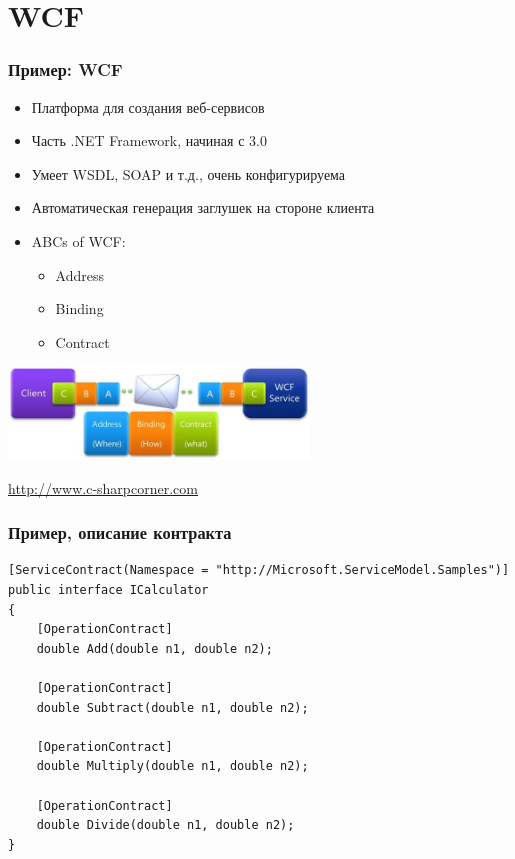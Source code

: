 \documentclass[xetex,mathserif,serif]{beamer}
\newcommand{\attribution}[1] {
    \begin{flushright}\begin{scriptsize}\textcolor{gray}{\textcopyright\; #1}\end{scriptsize}\end{flushright}
}
\begin{document}
    \section{WCF}

    \begin{frame}
        \frametitle{Пример: WCF}
        \begin{itemize}
            \item Платформа для создания веб-сервисов
            \item Часть .NET Framework, начиная с 3.0
            \item Умеет WSDL, SOAP и т.д., очень конфигурируема
            \item Автоматическая генерация заглушек на стороне клиента
            \item ABCs of WCF:
            \begin{itemize}
                \item Address
                \item Binding
                \item Contract
            \end{itemize}
        \end{itemize}
        \begin{center}
            \includegraphics[width=0.6\textwidth]{wcf.png}
            \attribution{\url{http://www.c-sharpcorner.com}}
        \end{center}
    \end{frame}

    \begin{frame}[fragile]
        \frametitle{Пример, описание контракта}
        \begin{small}
            \begin{verbatim}
[ServiceContract(Namespace = "http://Microsoft.ServiceModel.Samples")]  
public interface ICalculator  
{
    [OperationContract]
    double Add(double n1, double n2);

    [OperationContract]
    double Subtract(double n1, double n2);

    [OperationContract]
    double Multiply(double n1, double n2);

    [OperationContract]
    double Divide(double n1, double n2);
}
            \end{verbatim}
        \end{small}
    \end{frame}
\end{document}
